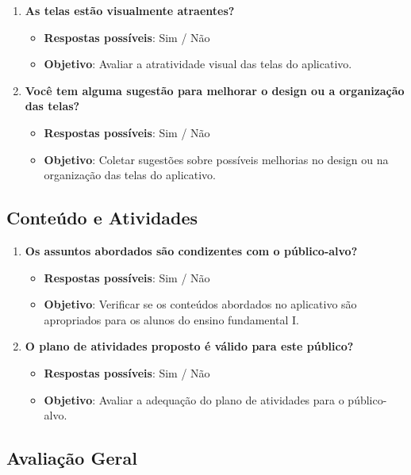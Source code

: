 \begin{enumerate}[label=\arabic*.]
    \item \textbf{As telas estão visualmente atraentes?}
    \begin{itemize}
        \item \textbf{Respostas possíveis}: Sim / Não
        \item \textbf{Objetivo}: Avaliar a atratividade visual das telas do aplicativo.
    \end{itemize}
    
    \item \textbf{Você tem alguma sugestão para melhorar o design ou a organização das telas?}
    \begin{itemize}
        \item \textbf{Respostas possíveis}: Sim / Não
        \item \textbf{Objetivo}: Coletar sugestões sobre possíveis melhorias no design ou na organização das telas do aplicativo.
    \end{itemize}
\end{enumerate}

\subsection{Conteúdo e Atividades}

\begin{enumerate}[label=\arabic*.]
    \item \textbf{Os assuntos abordados são condizentes com o público-alvo?}
    \begin{itemize}
        \item \textbf{Respostas possíveis}: Sim / Não
        \item \textbf{Objetivo}: Verificar se os conteúdos abordados no aplicativo são apropriados para os alunos do ensino fundamental I.
    \end{itemize}
    
    \item \textbf{O plano de atividades proposto é válido para este público?}
    \begin{itemize}
        \item \textbf{Respostas possíveis}: Sim / Não
        \item \textbf{Objetivo}: Avaliar a adequação do plano de atividades para o público-alvo.
    \end{itemize}
\end{enumerate}

\subsection{Avaliação Geral}


